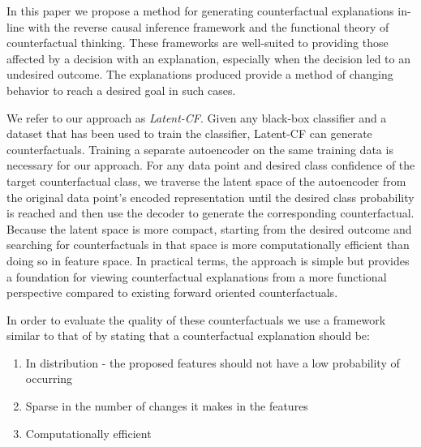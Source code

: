 \documentclass[letterpaper]{article} %
\begin{document}
In this paper we propose a method for generating counterfactual explanations in-line with the reverse causal inference framework and the functional theory of counterfactual thinking. These frameworks are well-suited to providing those affected by a decision with an explanation, especially when the decision led to an undesired outcome. The explanations produced provide a method of changing behavior to reach a desired goal in such cases.

We refer to our approach as \textit{Latent-CF}. Given any black-box classifier and a dataset that has been used to train the classifier, Latent-CF can generate counterfactuals. Training a separate autoencoder on the same training data is necessary for our approach. For any data point and desired class confidence of the target counterfactual class, we traverse the latent space of the autoencoder from the original data point's encoded representation until the desired class probability is reached and then use the decoder to generate the corresponding counterfactual.
Because the latent space is more compact, starting from the desired outcome and searching for counterfactuals in that space is more computationally efficient than doing so in feature space. In practical terms, the approach is simple but provides a foundation for viewing counterfactual explanations from a more functional perspective compared to existing forward oriented counterfactuals. 



In order to evaluate the quality of these counterfactuals we use a framework similar to that of \citet{looveren2019interpretable} by stating that a counterfactual explanation should be:

\begin{enumerate}
    \item In distribution - the proposed features should not have a low probability
of occurring
    \item Sparse in the number of changes it makes in the features
    \item Computationally efficient
\end{enumerate}
\end{document}
